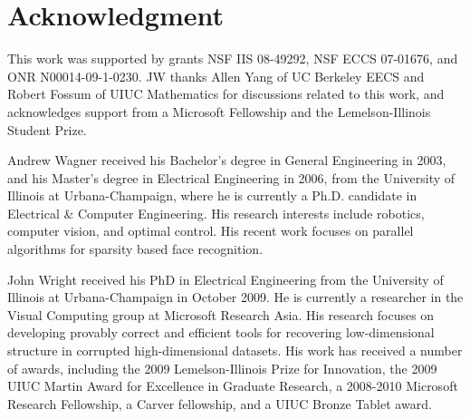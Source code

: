 \documentclass[10pt,journal,letterpaper,compsoc]{IEEEtran}
\begin{document}
\section*{Acknowledgment}
This work was supported by grants NSF IIS 08-49292, NSF ECCS
07-01676, and ONR N00014-09-1-0230. JW thanks Allen Yang of UC Berkeley EECS and Robert Fossum of UIUC
Mathematics for discussions related to this work, and
acknowledges support from a Microsoft Fellowship and
the Lemelson-Illinois Student Prize. 




\newcommand{\biospace}{\vspace{-4em}}
\biospace
\begin{IEEEbiography}{Andrew Wagner}
received his Bachelor's degree in General Engineering in 2003,
and his Master's degree in Electrical Engineering in 2006, from the University
of Illinois at Urbana-Champaign, where he is currently a Ph.D.
candidate in Electrical \& Computer Engineering.
His research interests include robotics, computer vision, and optimal control.
His recent work focuses on parallel algorithms for sparsity
based face recognition.\end{IEEEbiography}

\biospace
\begin{IEEEbiography}{John
Wright} received his PhD in Electrical Engineering from the
University of Illinois at Urbana-Champaign in October 2009. He is currently a
researcher in the Visual Computing group at Microsoft Research Asia.  His
research focuses on developing provably correct and efficient tools for
recovering low-dimensional structure in corrupted high-dimensional datasets.
His work has received a number of awards, including the 2009 Lemelson-Illinois
Prize for Innovation, the 2009 UIUC Martin Award for Excellence in Graduate
Research, a 2008-2010 Microsoft Research Fellowship, a Carver fellowship, and a
UIUC Bronze Tablet award.  \end{IEEEbiography}
\end{document}
